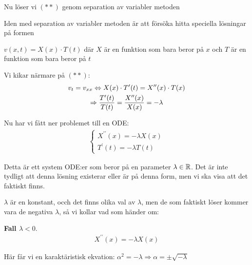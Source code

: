 \par\bigskip
\noindent Nu löser vi $(**)$ genom separation av variabler metoden
\par\bigskip
\noindent Iden med separation av variabler metoden är att försöka hitta speciella lösningar på formen\par\noindent $v(x,t) = X(x)\cdot T(t)$ där $X$ är en funktion som bara beror på $x$ och $T$ är en funktion som bara beror på $t$
\par\bigskip
\noindent Vi kikar närmare på $(**)$:
\begin{equation*}
  \begin{gathered}
    v_t = v_{xx}\Leftrightarrow X(x)\cdot T^{\prime}(t) = X^{\prime\prime}(x)\cdot T(x)\\
    \Rightarrow \dfrac{T^{\prime}(t)}{T(t)} = \dfrac{X^{\prime\prime}(x)}{X(x)} = -\lambda
  \end{gathered}
\end{equation*}
\par\bigskip
\noindent Nu har vi fått ner problemet till en ODE:
\begin{equation*}
  \begin{gathered}
    \begin{cases*}
      X^{\prime\prime}(x) = -\lambda X(x)\\
      T^{\prime}(t) = -\lambda T(t)
    \end{cases*}
  \end{gathered}
\end{equation*}\par
\noindent Detta är ett system ODE:er som beror på en parameter $\lambda\in\mathbb{R}$. Det är inte tydligt att denna lösning existerar eller är på denna form, men vi ska visa att det faktiskt finns. \par
\par\bigskip
\noindent $\lambda$ är en konstant, occh det finns olika val av $\lambda$, men de som faktiskt löser kommer vara de negativa $\lambda$, så vi kollar vad som händer om:
\par\bigskip
\noindent\textbf{Fall $\lambda<0$}.
\begin{equation*}
  \begin{gathered}
    X^{\prime\prime}(x) = -\lambda X(x)
  \end{gathered}
\end{equation*}\par
\noindent Här får vi en karaktäristisk ekvation: $\alpha^2=-\lambda\Rightarrow\alpha = \pm\sqrt{-\lambda}$\par
